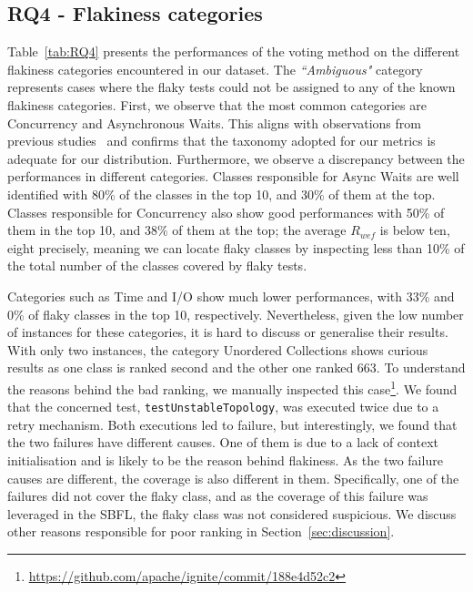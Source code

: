 \subsection{RQ4 - Flakiness categories}
Table~\ref{tab:RQ4} presents the performances of the voting method on the different flakiness categories encountered in our dataset.
The \textit{``Ambiguous"} category represents cases where the flaky tests could not be assigned to any of the known flakiness categories.
First, we observe that the most common categories are Concurrency and Asynchronous Waits.
This aligns with observations from previous studies~\cite{Luo2014,Lam2020a,Eck2019} and confirms that the taxonomy adopted for our metrics is adequate for our distribution.
Furthermore, we observe a discrepancy between the performances in different categories.
Classes responsible for Async Waits are well identified with 80\% of the classes in the top 10, and 30\% of them at the top.
Classes responsible for Concurrency also show good performances with 50\% of them in the top 10, and 38\% of them at the top; the average $R_{wef}$ is below ten, eight precisely, meaning we can locate flaky classes by inspecting less than 10\% of the total number of the classes covered by flaky tests. 

Categories such as Time and I/O show much lower performances, with 33\% and 0\% of flaky classes in the top 10, respectively.
Nevertheless, given the low number of instances for these categories, it is hard to discuss or generalise their results.
With only two instances, the category Unordered Collections shows curious results as one class is ranked second and the other one ranked 663. 
To understand the reasons behind the bad ranking, we manually inspected this case\footnote{\url{https://github.com/apache/ignite/commit/188e4d52c2}}.  
We found that the concerned test, \texttt{testUnstableTopology}, was executed twice due to a retry mechanism. Both executions led to failure, but interestingly, we found that the two failures have different causes. One of them is due to a lack of context initialisation and is likely to be the reason behind flakiness. 
As the two failure causes are different, the coverage is also different in them.
Specifically, one of the failures  did not cover the flaky class, and as the coverage of this failure was leveraged in the SBFL, the flaky class was not considered suspicious.
We discuss other reasons responsible for poor ranking in Section~\ref{sec:discussion}.


